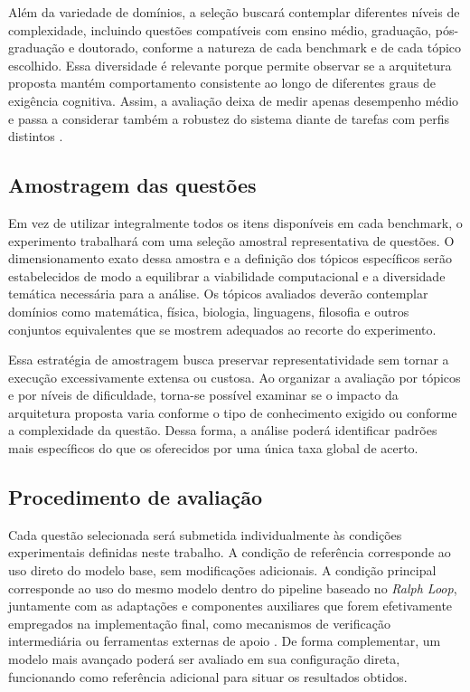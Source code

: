 \documentclass[a4paper,10pt,twocolumn]{article}
\begin{document}
Além da variedade de domínios, a seleção buscará contemplar diferentes níveis de complexidade, incluindo questões compatíveis com ensino médio, graduação, pós-graduação e doutorado, conforme a natureza de cada benchmark e de cada tópico escolhido. Essa diversidade é relevante porque permite observar se a arquitetura proposta mantém comportamento consistente ao longo de diferentes graus de exigência cognitiva. Assim, a avaliação deixa de medir apenas desempenho médio e passa a considerar também a robustez do sistema diante de tarefas com perfis distintos \cite{hendrycks2021measuring,rein2023gpqa}.

\subsection{Amostragem das questões}

Em vez de utilizar integralmente todos os itens disponíveis em cada benchmark, o experimento trabalhará com uma seleção amostral representativa de questões. O dimensionamento exato dessa amostra e a definição dos tópicos específicos serão estabelecidos de modo a equilibrar a viabilidade computacional e a diversidade temática necessária para a análise. Os tópicos avaliados deverão contemplar domínios como matemática, física, biologia, linguagens, filosofia e outros conjuntos equivalentes que se mostrem adequados ao recorte do experimento.

Essa estratégia de amostragem busca preservar representatividade sem tornar a execução excessivamente extensa ou custosa. Ao organizar a avaliação por tópicos e por níveis de dificuldade, torna-se possível examinar se o impacto da arquitetura proposta varia conforme o tipo de conhecimento exigido ou conforme a complexidade da questão. Dessa forma, a análise poderá identificar padrões mais específicos do que os oferecidos por uma única taxa global de acerto.

\subsection{Procedimento de avaliação}

Cada questão selecionada será submetida individualmente às condições experimentais definidas neste trabalho. A condição de referência corresponde ao uso direto do modelo base, sem modificações adicionais. A condição principal corresponde ao uso do mesmo modelo dentro do pipeline baseado no \textit{Ralph Loop}, juntamente com as adaptações e componentes auxiliares que forem efetivamente empregados na implementação final, como mecanismos de verificação intermediária ou ferramentas externas de apoio \cite{ghuntley2025ralph,zheng2024judging,li2024llms_judges,mcp_multiagent2025,sarkar2025mcp}. De forma complementar, um modelo mais avançado poderá ser avaliado em sua configuração direta, funcionando como referência adicional para situar os resultados obtidos.
\end{document}

